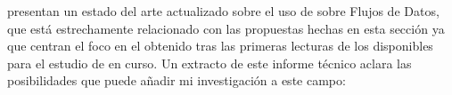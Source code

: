 \ABIERTO
\citet{FMenaHLeonHPalancar-ClasificacionBasadaEnCARFlujosDeDatos-2013} presentan un estado del arte actualizado sobre el uso de \CARs sobre Flujos de Datos, que está estrechamente relacionado con las propuestas hechas en esta sección ya que centran el foco en el \clasificador obtenido tras las primeras lecturas de los \datasets disponibles para el estudio de \clasificacion en curso. Un extracto de este informe técnico aclara las posibilidades que puede añadir mi investigación a este campo:



